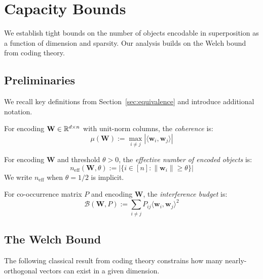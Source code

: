 \section{Capacity Bounds}
\label{sec:capacity}

We establish tight bounds on the number of objects encodable in superposition as a function of dimension and sparsity. Our analysis builds on the Welch bound from coding theory.

\subsection{Preliminaries}

We recall key definitions from Section~\ref{sec:equivalence} and introduce additional notation.

\begin{definition}[Coherence]
\label{def:coherence}
For encoding $\mathbf{W} \in \mathbb{R}^{d \times n}$ with unit-norm columns, the \emph{coherence} is:
\begin{equation}
\mu(\mathbf{W}) := \max_{i \neq j} |\langle \mathbf{w}_i, \mathbf{w}_j \rangle|
\end{equation}
\end{definition}

\begin{definition}
\label{def:eff_dim}
For encoding $\mathbf{W}$ and threshold $\theta > 0$, the \emph{effective number of encoded objects} is:
\begin{equation}
n_{\text{eff}}(\mathbf{W}, \theta) := |\{i \in [n] : \|\mathbf{w}_i\| \geq \theta\}|
\end{equation}
We write $n_{\text{eff}}$ when $\theta = 1/2$ is implicit.
\end{definition}

\begin{definition}
\label{def:budget}
For co-occurrence matrix $P$ and encoding $\mathbf{W}$, the \emph{interference budget} is:
\begin{equation}
\mathcal{B}(\mathbf{W}, P) := \sum_{i \neq j} P_{ij} \langle \mathbf{w}_i, \mathbf{w}_j \rangle^2
\end{equation}
\end{definition}

\subsection{The Welch Bound}

The following classical result from coding theory constrains how many nearly-orthogonal vectors can exist in a given dimension.

